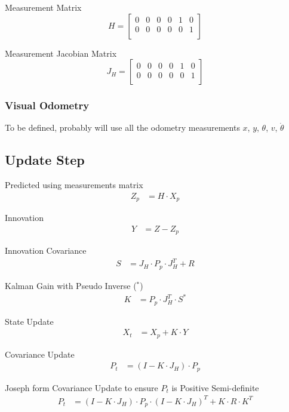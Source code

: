 Measurement Matrix
\begin{equation}
H
=
\begin{bmatrix}
0 & 0 & 0 & 0 & 1 & 0 \\
0 & 0 & 0 & 0 & 0 & 1 \\
\end{bmatrix}
\end{equation}

Measurement Jacobian Matrix
\begin{equation}
J_H
=
\begin{bmatrix}
0 & 0 & 0 & 0 & 1 & 0 \\
0 & 0 & 0 & 0 & 0 & 1 \\
\end{bmatrix}
\end{equation}

\subsubsection{Visual Odometry}
To be defined, probably will use all the odometry measurements $x$, $y$, $\theta$, $v$, $\dot \theta$

\subsection{Update Step}

Predicted using measurements matrix
\begin{align}
Z_p & = H \cdot X_p
\end{align}

Innovation
\begin{align}
Y & = Z - Z_p
\end{align}

Innovation Covariance
\begin{align}
S & = J_H \cdot P_p \cdot J_H^T + R
\end{align}

Kalman Gain with Pseudo Inverse ($^*$)
\begin{align}
K & = P_p \cdot J_H^T \cdot S^{*}
\end{align}

State Update
\begin{align}
X_t & = X_p + K \cdot Y
\end{align}

Covariance Update
\begin{align}
P_t & = (I - K \cdot J_H) \cdot P_p
\end{align}

Joseph form Covariance Update to ensure $P_t$ is Positive Semi-definite
\begin{align}
P_t & = (I - K \cdot J_H) \cdot P_p \cdot (I - K \cdot J_H)^T + K \cdot R \cdot K^T
\end{align}

